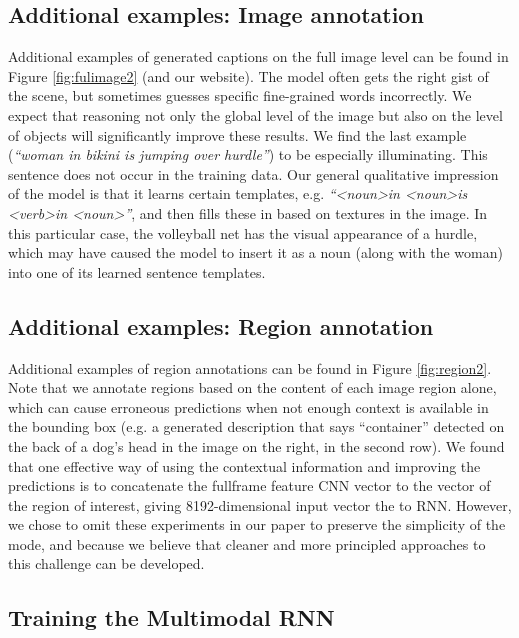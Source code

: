 \documentclass[10pt,twocolumn,letterpaper]{article}
\begin{document}
\subsection{Additional examples: Image annotation}
Additional examples of generated captions on the full image level can be found in Figure \ref{fig:fulimage2} (and our website). The model often gets the right gist of the scene, but sometimes guesses specific fine-grained words incorrectly. We expect that reasoning not only the global level of the image but also on the level of objects will significantly improve these results. We find the last example (\textit{``woman in bikini is jumping over hurdle''}) to be especially illuminating. This sentence does not occur in the training data. Our general qualitative impression of the model is that it learns certain templates, e.g. \textit{``\textless noun\textgreater in \textless noun\textgreater is \textless verb\textgreater in \textless noun\textgreater''}, and then fills these in based on textures in the image. In this particular case, the volleyball net has the visual appearance of a hurdle, which may have caused the model to insert it as a noun (along with the woman) into one of its learned sentence templates.

\subsection{Additional examples: Region annotation}

Additional examples of region annotations can be found in Figure \ref{fig:region2}. Note that we annotate regions based on the content of each image region alone, which can cause erroneous predictions when not enough context is available in the bounding box (e.g. a generated description that says ``container'' detected on the back of a dog's head in the image on the right, in the second row). We found that one effective way of using the contextual information and improving the predictions is to concatenate the fullframe feature CNN vector to the vector of the region of interest, giving 8192-dimensional input vector the to RNN. However, we chose to omit these experiments in our paper to preserve the simplicity of the mode, and because we believe that cleaner and more principled approaches to this challenge can be developed.

\subsection{Training the Multimodal RNN}
\end{document}
